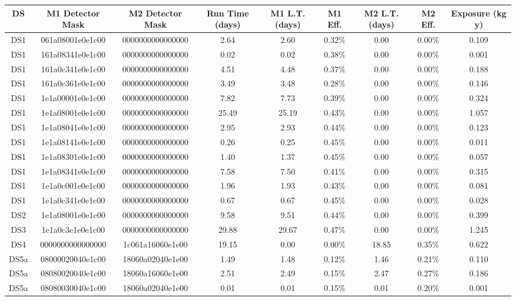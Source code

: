 \begin{tabular}{|c|c c|c|c c|c c|c|}
\hline
  DS & M1 Detector Mask & M2 Detector Mask & Run Time (days) & M1 L.T. (days) & M1 Eff. & M2 L.T. (days) & M2 Eff. & Exposure (kg y) \\
\hline
  DS1 & 061a08001e0e1c00 & 0000000000000000 & 2.64 & 2.60 & 0.32\% & 0.00 & 0.00\% & 0.109 \\
  DS1 & 161a08341e0e1c00 & 0000000000000000 & 0.02 & 0.02 & 0.38\% & 0.00 & 0.00\% & 0.001 \\
  DS1 & 161a0c341e0e1c00 & 0000000000000000 & 4.51 & 4.48 & 0.37\% & 0.00 & 0.00\% & 0.188 \\
  DS1 & 161a0c361e0e1c00 & 0000000000000000 & 3.49 & 3.48 & 0.28\% & 0.00 & 0.00\% & 0.146 \\
  DS1 & 1e1a00001e0e1c00 & 0000000000000000 & 7.82 & 7.73 & 0.39\% & 0.00 & 0.00\% & 0.324 \\
  DS1 & 1e1a08001e0e1c00 & 0000000000000000 & 25.49 & 25.19 & 0.43\% & 0.00 & 0.00\% & 1.057 \\
  DS1 & 1e1a08041e0e1c00 & 0000000000000000 & 2.95 & 2.93 & 0.44\% & 0.00 & 0.00\% & 0.123 \\
  DS1 & 1e1a08141e0e1c00 & 0000000000000000 & 0.26 & 0.25 & 0.45\% & 0.00 & 0.00\% & 0.011 \\
  DS1 & 1e1a08301e0e1c00 & 0000000000000000 & 1.40 & 1.37 & 0.45\% & 0.00 & 0.00\% & 0.057 \\
  DS1 & 1e1a08341e0e1c00 & 0000000000000000 & 7.58 & 7.50 & 0.41\% & 0.00 & 0.00\% & 0.315 \\
  DS1 & 1e1a0c001e0e1c00 & 0000000000000000 & 1.96 & 1.93 & 0.43\% & 0.00 & 0.00\% & 0.081 \\
  DS1 & 1e1a0c341e0e1c00 & 0000000000000000 & 0.67 & 0.67 & 0.45\% & 0.00 & 0.00\% & 0.028 \\
  DS2 & 1e1a08001e0e1c00 & 0000000000000000 & 9.58 & 9.51 & 0.44\% & 0.00 & 0.00\% & 0.399 \\
  DS3 & 1e1a0c3e1e0e1c00 & 0000000000000000 & 29.88 & 29.67 & 0.47\% & 0.00 & 0.00\% & 1.245 \\
  DS4 & 0000000000000000 & 1c061a16060e1e00 & 19.15 & 0.00 & 0.00\% & 18.85 & 0.35\% & 0.622 \\
  DS5a & 08000020040e1c00 & 18060a02040e1e00 & 1.49 & 1.48 & 0.12\% & 1.46 & 0.21\% & 0.110 \\
  DS5a & 08080020040e1c00 & 18060a16060e1e00 & 2.51 & 2.49 & 0.15\% & 2.47 & 0.27\% & 0.186 \\
  DS5a & 08080030040e1c00 & 18060a02040e1e00 & 0.01 & 0.01 & 0.15\% & 0.01 & 0.20\% & 0.001 \\

\end{tabular}

